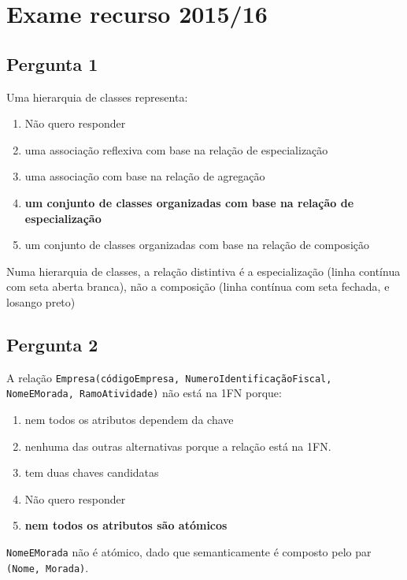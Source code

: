 \documentclass[type=recurso, year=2015/16]{bdad_exam}
\begin{document}
{
\renewcommand{\thechapter}{\arabic{chapter}R}
\setcounter{chapter}{15}
\chapter{Exame recurso 2015/16}
\section{Pergunta 1}
Uma hierarquia de classes representa:
\begin{enumerate}[label=\alph*.]\itemsep0em
    \item Não quero responder
    \item uma associação reflexiva com base na relação de especialização
    \item uma associação com base na relação de agregação
    \item \textbf{um conjunto de classes organizadas com base na relação de especialização \greencheckmark}
    \item um conjunto de classes organizadas com base na relação de composição
\end{enumerate}
Numa hierarquia de classes, a relação distintiva é a especialização (linha contínua com seta aberta branca), não a composição (linha contínua com seta fechada, e losango preto)

\section{Pergunta 2}
A relação \texttt{Empresa(códigoEmpresa, NumeroIdentificaçãoFiscal, NomeEMorada, RamoAtividade)} não está na 1FN porque:
\begin{enumerate}[label=\alph*.]\itemsep0em
    \item nem todos os atributos dependem da chave
    \item nenhuma das outras alternativas porque a relação está na 1FN.
    \item tem duas chaves candidatas
    \item Não quero responder
    \item \textbf{nem todos os atributos são atómicos \greencheckmark}
\end{enumerate}
\texttt{NomeEMorada} não é atómico, dado que semanticamente é composto pelo par \texttt{(Nome, Morada)}.

}
\end{document}

